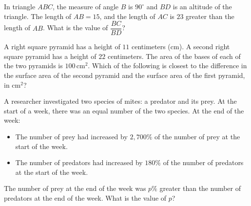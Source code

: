 \vspace{0.75em}


\vspace{2em}
\newpage

\noindent\markforreview
\vspace{1em}

In triangle \(ABC\), the measure of angle \(B\) is \(90^\circ\) and \(BD\) is an altitude of the triangle. The length of \(AB = 15\), and the length of \(AC\) is \(23\) greater than the length of \(AB\). What is the value of \(\dfrac{BC}{BD}\)?

\vspace{0.75em}


\vspace{2em}
\newpage

\noindent\markforreview
\vspace{1em}

A right square pyramid has a height of \(11\) centimeters (cm). A second right square pyramid has a height of \(22\) centimeters. The area of the bases of each of the two pyramids is \(100\,\text{cm}^{2}\).
Which of the following is closest to the difference in the surface area of the second pyramid and the surface area of the first pyramid, in \(\text{cm}^{2}\)?

\vspace{0.75em}


\vspace{2em}
\newpage

\noindent\markforreview
\vspace{1em}

A researcher investigated two species of mites: a predator and its prey. At the start of a week, there was an equal number of the two species. At the end of the week:
\begin{itemize}
\item The number of prey had increased by \(2{,}700\%\) of the number of prey at the start of the week.
\item The number of predators had increased by \(180\%\) of the number of predators at the start of the week.
\end{itemize}
The number of prey at the end of the week was \(p\%\) greater than the number of predators at the end of the week. What is the value of \(p\)?

